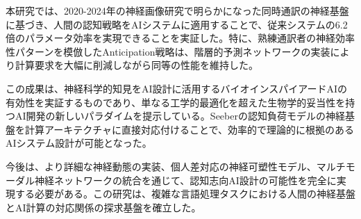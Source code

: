本研究では、2020-2024年の神経画像研究で明らかになった同時通訳の神経基盤に基づき、人間の認知戦略をAIシステムに適用することで、従来システムの6.2倍のパラメータ効率を実現できることを実証した。特に、熟練通訳者の神経効率性パターンを模倣したAnticipation戦略は、階層的予測ネットワークの実装により計算要求を大幅に削減しながら同等の性能を維持した。

この成果は、神経科学的知見をAI設計に活用するバイオインスパイアードAIの有効性を実証するものであり、単なる工学的最適化を超えた生物学的妥当性を持つAI開発の新しいパラダイムを提示している。Seeberの認知負荷モデルの神経基盤を計算アーキテクチャに直接対応付けることで、効率的で理論的に根拠のあるAIシステム設計が可能となった。

今後は、より詳細な神経動態の実装、個人差対応の神経可塑性モデル、マルチモーダル神経ネットワークの統合を通じて、認知志向AI設計の可能性を完全に実現する必要がある。この研究は、複雑な言語処理タスクにおける人間の神経基盤とAI計算の対応関係の探求基盤を確立した。 